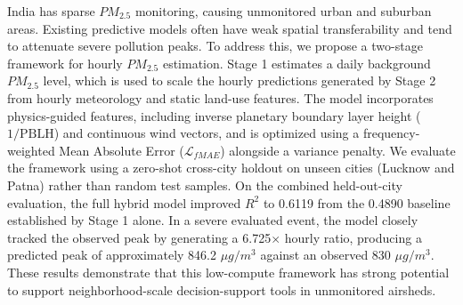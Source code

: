 India has sparse $PM_{2.5}$ monitoring, causing unmonitored urban and suburban areas. Existing predictive models often have weak spatial transferability and tend to attenuate severe pollution peaks. To address this, we propose a two-stage framework for hourly $PM_{2.5}$ estimation. Stage 1 estimates a daily background $PM_{2.5}$ level, which is used to scale the hourly predictions generated by Stage 2 from hourly meteorology and static land-use features. The model incorporates physics-guided features, including inverse planetary boundary layer height ($1/\text{PBLH}$) and continuous wind vectors, and is optimized using a frequency-weighted Mean Absolute Error ($\mathcal{L}_{fMAE}$) alongside a variance penalty. We evaluate the framework using a zero-shot cross-city holdout on unseen cities (Lucknow and Patna) rather than random test samples. On the combined held-out-city evaluation, the full hybrid model improved $R^2$ to 0.6119 from the 0.4890 baseline established by Stage 1 alone. In a severe evaluated event, the model closely tracked the observed peak by generating a 6.725$\times$ hourly ratio, producing a predicted peak of approximately 846.2 $\mu g/m^3$ against an observed 830 $\mu g/m^3$. These results demonstrate that this low-compute framework has strong potential to support neighborhood-scale decision-support tools in unmonitored airsheds.
